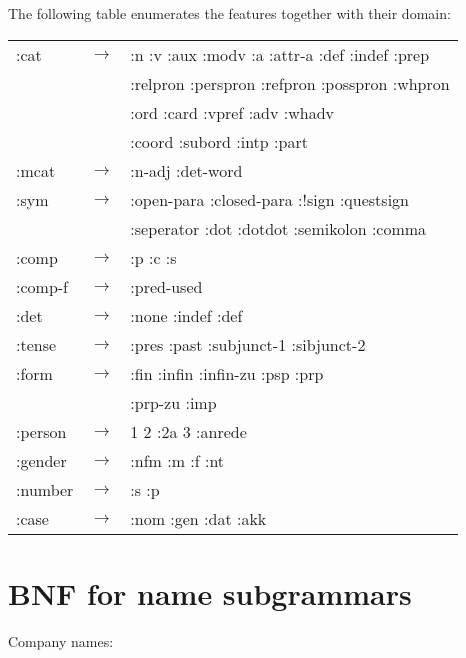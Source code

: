 The following table enumerates the features together with
their domain:

\begin{tabular}{lll}
:cat     & $\rightarrow$ & :n :v :aux :modv :a :attr-a :def :indef :prep\\
         &               & :relpron :perspron :refpron :posspron :whpron \\
         &               & :ord :card :vpref :adv :whadv \\
         &               & :coord :subord  :intp :part\\
:mcat    & $\rightarrow$ & :n-adj :det-word\\
:sym     & $\rightarrow$ & :open-para :closed-para :!sign :questsign\\ 
         &               & :seperator :dot :dotdot :semikolon :comma\\
:comp    & $\rightarrow$ & :p :c :s\\
:comp-f  & $\rightarrow$ & :pred-used\\
:det     & $\rightarrow$ & :none :indef :def\\
:tense   & $\rightarrow$ & :pres :past :subjunct-1 :sibjunct-2\\
:form    & $\rightarrow$ & :fin :infin :infin-zu :psp :prp \\
         &               & :prp-zu :imp \\
:person  & $\rightarrow$ & 1 2 :2a 3 :anrede\\
:gender  & $\rightarrow$ & :nfm :m :f :nt\\
:number  & $\rightarrow$ & :s :p\\
:case    & $\rightarrow$ & :nom :gen :dat :akk\\     
\end{tabular}

\section{BNF for name subgrammars}
\label{names}

Company names:


